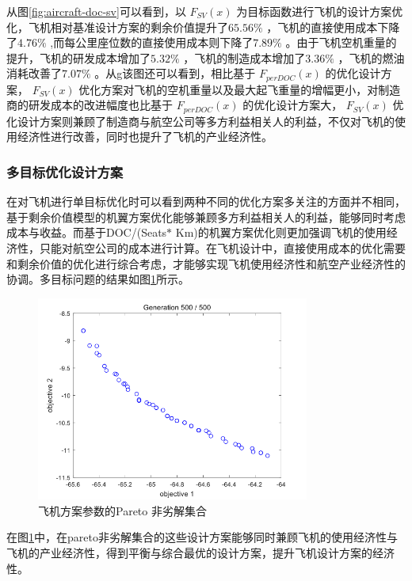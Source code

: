 \documentclass[12pt,a4paper]{report}
\begin{document}
从图\ref{fig:aircraft-doc-sv}可以看到，以 $ F_{SV} \left( x \right)  $ 为目标函数进行飞机的设计方案优化，飞机相对基准设计方案的剩余价值提升了$65.56\%$ ，飞机的直接使用成本下降了$4.76\%$ ,而每公里座位数的直接使用成本则下降了$7.89\%$ 。由于飞机空机重量的提升，飞机的研发成本增加了$5.32\%$ ，飞机的制造成本增加了$3.36\%$ ，飞机的燃油消耗改善了$7.07\%$ 。从g该图还可以看到，相比基于 $ F_{perDOC} \left( x \right)  $ 的优化设计方案， $ F_{SV} \left( x \right)  $ 优化方案对飞机的空机重量以及最大起飞重量的增幅更小，对制造商的研发成本的改进幅度也比基于 $ F_{perDOC} \left( x \right)  $ 的优化设计方案大， $ F_{SV} \left( x \right)  $ 优化设计方案则兼顾了制造商与航空公司等多方利益相关人的利益，不仅对飞机的使用经济性进行改善，同时也提升了飞机的产业经济性。

\subsubsection{多目标优化设计方案}
在对飞机进行单目标优化时可以看到两种不同的优化方案多关注的方面并不相同，基于剩余价值模型的机翼方案优化能够兼顾多方利益相关人的利益，能够同时考虑成本与收益。而基于DOC/(Seats$\ast$ Km)的机翼方案优化则更加强调飞机的使用经济性，只能对航空公司的成本进行计算。在飞机设计中，直接使用成本的优化需要和剩余价值的优化进行综合考虑，才能够实现飞机使用经济性和航空产业经济性的协调。多目标问题的结果如图\ref{fig:aircraft-pareto}所示。

\begin{figure}[htp]
  \centering
  \includegraphics[width=0.8\textwidth]{./media4/aircraft-pareto.png}
  \caption{飞机方案参数的Pareto 非劣解集合}
  \label{fig:aircraft-pareto}
\end{figure}

在图\ref{fig:aircraft-pareto}中，在pareto非劣解集合的这些设计方案能够同时兼顾飞机的使用经济性与飞机的产业经济性，得到平衡与综合最优的设计方案，提升飞机设计方案的经济性。
\end{document}
